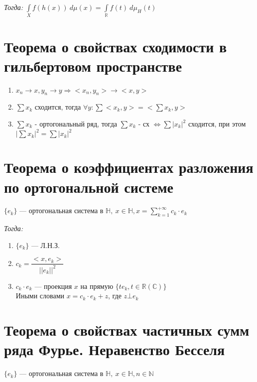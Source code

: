 \documentclass[paper=a4, fontsize=17pt]{article}
\begin{document}
\emph{Тогда:} $\int\limits_X f(h(x))~d\mu(x) = \int\limits_{\mathbb{R}}f(t)~d\mu_{H}(t)$

\section{Теорема о свойствах сходимости в гильбертовом пространстве}
\begin{enumerate}
	\item $x_n \rightarrow x, y_n \rightarrow y \Rightarrow <x_n, y_n> \rightarrow <x, y>$
	
	\item $\sum x_k$ сходится, тогда $\forall y: \sum <x_k, y> = <\sum x_k, y>$
	
	\item $\sum x_k$ - ортогональный ряд, тогда $\sum x_k$ - сх $\Leftrightarrow \sum |x_k|^2$ сходится, при этом $|\sum x_k|^2 = \sum |x_k|^2$
	
\end{enumerate}

\section{Теорема о коэффициентах разложения по ортогональной системе}

$\{e_k\}$ {{---}} ортогональная система в $\mathds{H},\ x \in \mathds{H}, x = \sum\limits_{k=1}^{+\infty} c_k \cdot e_k$

\emph{Тогда:}
\begin{enumerate}

	\item $\{e_k\}$ {{---}} Л.Н.З.
	
	\item $c_k = \dfrac{<x, e_k>}{||e_k||^2}$
	
	\item $c_k \cdot e_k$ {{---}} проекция $x$ на прямую $\{te_k, t \in \mathbb{R}(\mathbb{C})\}$\\ 
	Иными словами $x = c_k \cdot e_k + z$, где $z \bot e_k$

\end{enumerate}

\section{Теорема о свойствах частичных сумм ряда Фурье. Неравенство Бесселя}

$\{e_k\}$ {{---}} ортогональная система в $\mathds{H},\ x \in \mathds{H}, n \in \mathbb{N}$
\end{document}
